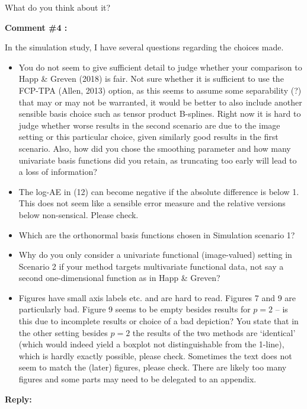 \documentclass[11pt]{article}
\begin{document}
What do you think about it?

\bigskip


\itshape


\textbf{Comment \#4 :}

In the simulation study, I have several questions regarding the choices made.
\begin{itemize}
  \item You do not seem to give sufficient detail to judge whether your comparison to Happ \& Greven (2018) is fair. Not sure whether it is sufficient to use the FCP-TPA (Allen, 2013) option, as this seems to assume some separability (?) that may or may not be warranted, it would be better to also include another sensible basis choice such as tensor product B-splines. Right now it is hard to judge whether worse results in the second scenario are due to the image setting or this particular choice, given similarly good results in the first scenario. Also, how did you chose the smoothing parameter and how many univariate basis functions did you retain, as truncating too early will lead to a loss of information?
  \item The log-AE in (12) can become negative if the absolute difference is below 1. This does not seem like a sensible error measure and the relative versions below non-sensical. Please check.
  \item Which are the orthonormal basis functions chosen in Simulation scenario 1?
  \item Why do you only consider a univariate functional (image-valued) setting in Scenario 2 if your method targets multivariate functional data, not say a second one-dimensional function as in Happ \& Greven?
  \item Figures have small axis labels etc. and are hard to read. Figures 7 and 9 are particularly bad. Figure 9 seems to be empty besides results for $p=2$ – is this due to incomplete results or choice of a bad depiction? You state that in the other setting besides $p=2$ the results of the two methods are ‘identical’ (which would indeed yield a boxplot not distinguishable from the 1-line), which is hardly exactly possible, please check. Sometimes the text does not seem to match the (later) figures, please check. There are likely too many figures and some parts may need to be delegated to an appendix.
\end{itemize}


\medskip

\normalfont

\textbf{Reply:}
\end{document}
